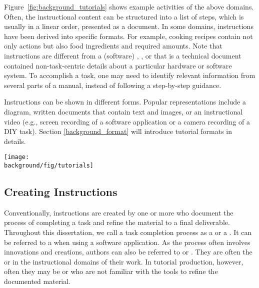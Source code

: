 Figure~\ref{fig:background_tutorials} shows example activities of the above domains.
\\

%
Often, the instructional content can be structured into a list of steps, which is usually in a linear order, presented as a  document.
%
In some domains, instructions have been derived into specific formats. For example, cooking recipes contain not only actions but also food ingredients and required amounts.
%
Note that instructions are different from a (software) , , or  that is a technical document contained non-task-centric details about a particular hardware or software system. To accomplish a task, one may need to identify relevant information from several parts of a manual, instead of following a step-by-step guidance.

Instructions can be shown in different forms. Popular representations include a diagram, written documents that contain text and images, or an instructional video (e.g., screen recording of a software application or a camera recording of a DIY task). Section \ref{background_format} will introduce tutorial formats in details.

\begin{figure*}[t]
  \centering
  \texttt{[image: \\background/fig/tutorials]}
  \caption{Example activities in tutorial domains: a) image manipulations using a software application, b) a DIY gift-wrapping project, c) cooking as an everyday activity, and d) dancing in sports. }
  \label{fig:background_tutorials}
\end{figure*}

\subsection{Creating Instructions}
Conventionally, instructions are created by one or more  who document the process of completing a task and refine the material to a final deliverable.
%
Throughout this dissertation, we call a task completion process as a  or a . It can be referred to a  when using a software application.
%
As the process often involves innovations and creations, authors can also be referred to  or . They are often the  or  in the instructional domains of their work. In tutorial production, however, often they may be  or  who are not familiar with the tools to refine the documented material.

